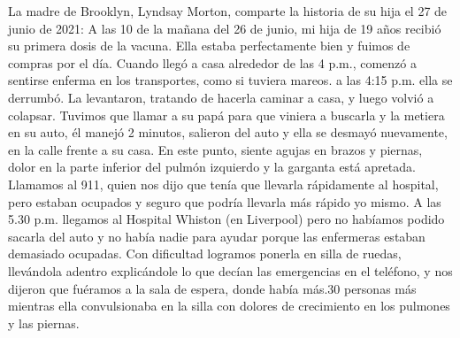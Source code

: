 La madre de Brooklyn, Lyndsay Morton, comparte la historia de su hija el 27 de
junio de 2021: A las 10 de la mañana del 26 de junio, mi hija de 19 años recibió
su primera dosis de la vacuna. Ella estaba perfectamente bien y fuimos de
compras por el día. Cuando llegó a casa alrededor de las 4 p.m., comenzó a
sentirse enferma en los transportes, como si tuviera mareos. a las 4:15
p.m. ella se derrumbó. La levantaron, tratando de hacerla caminar a casa, y
luego volvió a colapsar. Tuvimos que llamar a su papá para que viniera a
buscarla y la metiera en su auto, él manejó 2 minutos, salieron del auto y ella
se desmayó nuevamente, en la calle frente a su casa. En este punto, siente
agujas en brazos y piernas, dolor en la parte inferior del pulmón izquierdo y la
garganta está apretada. Llamamos al 911, quien nos dijo que tenía que llevarla
rápidamente al hospital, pero estaban ocupados y seguro que podría llevarla más
rápido yo mismo. A las 5.30 p.m. llegamos al Hospital Whiston (en Liverpool)
pero no habíamos podido sacarla del auto y no había nadie para ayudar porque las
enfermeras estaban demasiado ocupadas. Con dificultad logramos ponerla en silla
de ruedas, llevándola adentro explicándole lo que decían las emergencias en el
teléfono, y nos dijeron que fuéramos a la sala de espera, donde había más.30
personas más mientras ella convulsionaba en la silla con dolores de crecimiento
en los pulmones y las piernas.

